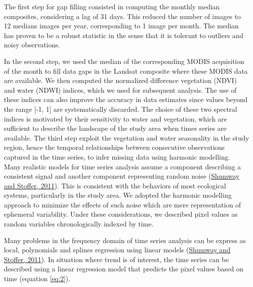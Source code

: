\documentclass[utf8]{frontiersSCNS}
\begin{document}
The first step for gap filling consisted in computing the monthly median
composites, considering a lag of 31 days. This reduced the number of
images to 12 medians images per year, corresponding to 1 image per
month. The median has proven to be a robust statistic in the sense that
it is tolerant to outliers and noisy observations.

In the second step, we used the median of the corresponding MODIS
acquisition of the month to fill data gaps in the Landsat composite
where these MODIS data are available. We then computed the normalized
difference vegetation (NDVI) and water (NDWI) indices, which we used for
subsequent analysis. The use of these indices can also improve the
accuracy in data estimates since values beyond the range {[}-1, 1{]} are
systematically discarded. The choice of these two spectral indices is
motivated by their sensitivity to water and vegetation, which are
sufficient to describe the landscape of the study area when times series
are available. The third step exploit the vegetation and water
seasonality in the study region, hence the temporal relationships
between consecutive observations captured in the time series, to infer
missing data using harmonic modelling. Many realistic models for time
series analysis assume a component describing a consistent signal and
another component representing random noise
(\protect\hyperlink{ref-Shumway-and-Stoffer-2011}{Shumway and Stoffer,
2011}). This is consistent with the behaviors of most ecological
systems, particularly in the study area. We adopted the harmonic
modelling approach to minimize the effects of such noise which are mere
representation of ephemeral variability. Under these considerations, we
described pixel values as random variables chronologically indexed by
time.

Many problems in the frequency domain of time series analysis can be
express as local, polynomials and splines regression using linear models
(\protect\hyperlink{ref-Shumway-and-Stoffer-2011}{Shumway and Stoffer,
2011}). In situation where trend is of interest, the time series can be
described using a linear regression model that predicts the pixel values
based on time (equation \ref{eq:2}).

\end{document}
